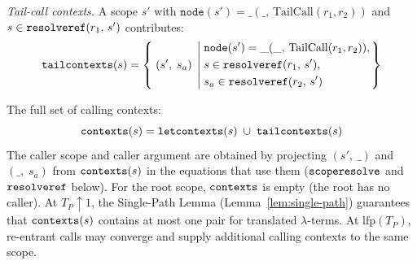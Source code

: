 \emph{Tail-call contexts.}\;
A scope $s'$ with
$\mathtt{node}(s') = \_(\_,\, \mathrm{TailCall}(r_1, r_2))$
and $s \in \mathtt{resolveref}(r_1,\, s')$ contributes:
\begin{equation}\label{eq:lambda-tail-contexts}
  \mathtt{tailcontexts}(s) =
  \left\{\; (s',\; s_a) \;\left|\;
    \begin{aligned}
      &\mathtt{node}(s') = \_(\_,\, \mathrm{TailCall}(r_1, r_2)),\\
      &s \in \mathtt{resolveref}(r_1,\, s'),\\
      &s_a \in \mathtt{resolveref}(r_2,\, s')
    \end{aligned}
  \right.\right\}
\end{equation}

The full set of calling contexts:
\begin{equation}\label{eq:lambda-contexts}
  \mathtt{contexts}(s) =
    \mathtt{letcontexts}(s) \;\cup\;
    \mathtt{tailcontexts}(s)
\end{equation}
The caller scope and caller argument are obtained by
projecting $(s',\; \_)$ and $(\_,\; s_a)$ from
$\mathtt{contexts}(s)$ in the equations that use them
($\mathtt{scoperesolve}$ and $\mathtt{resolveref}$ below).
For the root scope, $\mathtt{contexts}$ is empty
(the root has no caller).
At $T_P\!\uparrow\!1$, the Single-Path Lemma
(Lemma~\ref{lem:single-path}) guarantees that
$\mathtt{contexts}(s)$ contains at most one pair for
translated $\lambda$-terms.
At $\mathrm{lfp}(T_P)$, re-entrant calls may converge and
supply additional calling contexts to the same scope.

